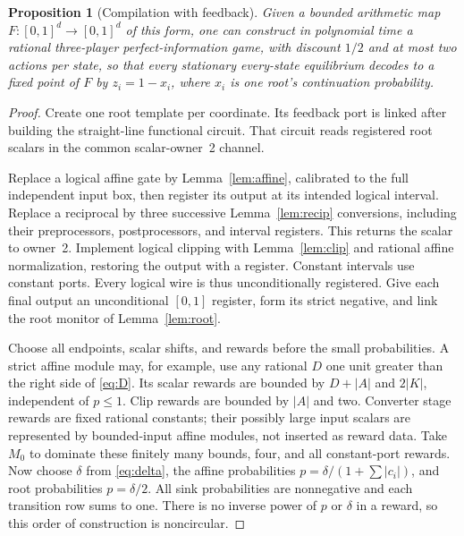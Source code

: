 \documentclass[11pt,a4paper]{article}
\numberwithin{equation}{section}
\newtheorem{proposition}[theorem]{Proposition}
\theoremstyle{definition}
\begin{document}
\begin{proposition}[Compilation with feedback]\label{prop:compiler}
Given a bounded arithmetic map \(F:[0,1]^d\to[0,1]^d\) of this form,
one can construct in polynomial time a rational three-player
perfect-information game, with discount \(1/2\) and at most two actions
per state, so that every stationary every-state equilibrium decodes to
a fixed point of \(F\) by \(z_i=1-x_i\), where \(x_i\) is one root's
continuation probability.
\end{proposition}
\begin{proof}
Create one root template per coordinate. Its feedback port is linked
after building the straight-line functional circuit. That circuit reads
registered root scalars in the common scalar-owner~2 channel.

Replace a logical affine gate by Lemma~\ref{lem:affine}, calibrated to
the full independent input box, then register its output at its intended
logical interval. Replace a reciprocal by three successive
Lemma~\ref{lem:recip} conversions, including their preprocessors,
postprocessors, and interval registers. This returns the scalar to
owner~2. Implement logical clipping with Lemma~\ref{lem:clip} and
rational affine normalization, restoring the output with a register.
Constant intervals use constant ports. Every logical wire is thus
unconditionally registered. Give each final output an unconditional
\([0,1]\) register, form its strict negative, and link the root
monitor of Lemma~\ref{lem:root}.

Choose all endpoints, scalar shifts, and rewards before the small
probabilities. A strict affine module may, for example, use any
rational \(D\) one unit greater than the right side of \eqref{eq:D}.
Its scalar rewards are bounded by \(D+|A|\) and \(2|K|\), independent
of \(p\leq1\). Clip rewards are bounded by \(|A|\) and two.
Converter stage rewards are fixed rational constants; their possibly
large input scalars are represented by bounded-input affine modules,
not inserted as reward data. Take \(M_0\) to dominate these finitely
many bounds, four, and all constant-port rewards. Now choose
\(\delta\) from \eqref{eq:delta}, the affine probabilities
\(p=\delta/(1+\sum|c_i|)\), and root probabilities
\(p=\delta/2\). All sink probabilities are nonnegative and each
transition row sums to one. There is no inverse power of \(p\) or
\(\delta\) in a reward, so this order of construction is noncircular.


\end{proof}
\end{document}
